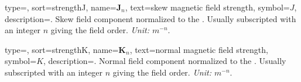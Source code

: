 {
    type=\symboltype,
    sort={strengthJ},
    name={$\bm J_n$},
    text={skew magnetic field strength},
    symbol={\ensuremath{J}},
    description={.
    Skew field component normalized to the .
    Usually subscripted with an integer $n$ giving the field order.
    \textit{Unit: $m^{-n}$}.\\
    }
}

{
    type=\symboltype,
    sort={strengthK},
    name={$\bm K_n$},
    text={normal magnetic field strength},
    symbol={\ensuremath{K}},
    description={.
    Normal field component normalized to the .
    Usually subscripted with an integer $n$ giving the field order.
    \textit{Unit: $m^{-n}$}.\\
    }
}
